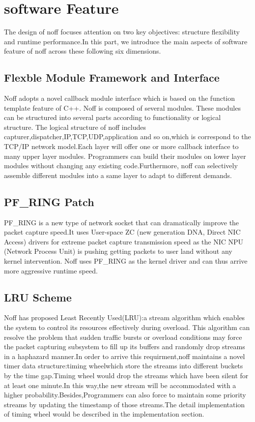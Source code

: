 \documentclass[conference]{IEEEtran}
\begin{document}
\section{software Feature}
The design of noff focuses attention on two key objectives: structure flexibility and runtime performance.In this part, we introduce the main aspects of software feature of noff across these following six dimensions.

\subsection{Flexble Module Framework and Interface}

Noff adopts a novel callback module interface which is based on the function template feature of C++. Noff is composed of several modules.
These modules can be structured into several parts according to functionality or logical structure. The logical structure of noff includes capturer,dispatcher,IP,TCP,UDP,application and so on,which is correspond to the TCP/IP network model.Each layer will offer one or more callback interface to many upper layer modules. Programmers can build their modules on lower layer modules without changing any existing code.Furthermore, noff can selectively assemble different modules into a same layer to adapt to different demands.

\subsection{PF\_RING Patch}
PF\_RING is a new type of network socket that can dramatically improve the packet capture speed.It uses User-space ZC (new generation DNA, Direct NIC Access) drivers for extreme packet capture transmission speed as the NIC NPU (Network Process Unit) is pushing getting packets to user land without any kernel intervention. 
Noff uses PF\_RING as the kernel driver and can thus arrive more aggressive runtime speed.

\subsection{LRU Scheme}
Noff has proposed Least Recently Used(LRU):a stream algorithm which enables the system to control its resources effectively during overload. This algorithm can resolve the problem that sudden traffic bursts or overload conditions may force the packet capturing subsystem to fill up its buffers and randomly drop streams in a haphazard manner.In order to arrive this requirment,noff maintains a novel timer data structure:timing wheel\cite{Varghese}which store the streams into different buckets by the time gap.Timing wheel would drop the streams which have been silent for at least one minute.In this way,the new stream will be accommodated with a higher probability.Besides,Programmers can also force to maintain some priority streams by updating the timestamp of those streams.The detail implementation of timing wheel would be described in the implementation section.
\end{document}
